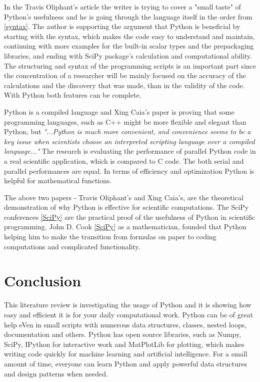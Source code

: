 \documentclass{article}
\begin{document}
 In the Travis Oliphant's article \cite{oliphant2007python} the writer is trying to cover a "small taste" of Python’s usefulness and he is going through the language itself in the order from \ref{syntax}. The author is supporting the argument that Python is beneficial by starting with the syntax, which makes the code easy to understand and maintain, continuing with more examples for the built-in scalar types and the prepackaging libraries, and ending with SciPy package's calculation and computational ability. The structuring and syntax of the programming scripts is an important part since the concentration of a researcher will be mainly focused on the accuracy of the calculations and the discovery that was made, than in the validity of the code. With Python both features can be complete. 
 
Python is a compiled language and Xing Caia's paper \cite{cai2005performance} 
is proving that some programming languages, such as C++ might be more flexible and elegant than Python, but \textit{"...Python is much more convenient, and convenience seems to be a key issue when scientists choose an interpreted scripting language over a compiled language..."} \cite{cai2005performance} The research is evaluating the performance of parallel Python code in a real scientific application, which is compared to C code. The both serial and parallel performances are equal. In terms of efficiency and optimization Python is helpful for mathematical functions.

The above two papers - Travis Oliphant's  and Xing Caia's, are the theoretical demonstration of why Python is effective for scientific computations. The SciPy conferences \ref{SciPy} are the practical proof of the usefulness of Python in scientific programming. John D. Cook \ref{SciPy} as a mathematician, founded that Python helping him to make the transition from formulas on paper to coding computations and complicated functionality. 

\section{Conclusion}
This literature review is investigating the usage of Python and it is showing how easy and efficient it is for your daily computational work. Python can be of great help eVen in small scripts with numerous data structures, classes, nested loops, documentation and others. Python has open source libraries, such as Numpy, SciPy, IPython for interactive work and MatPlotLib for plotting, which makes writing code quickly for machine learning and artificial intelligence. For a small amount of time, everyone can learn Python and apply powerful data structures and design patterns when needed.





\end{document}
